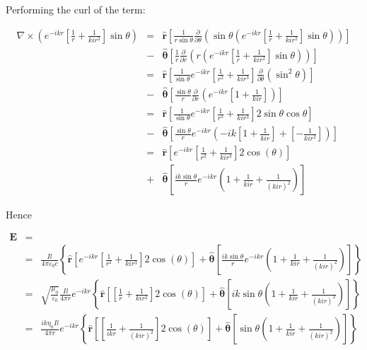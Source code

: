 \documentclass[a4paper,10pt]{thesis}
\begin{document}
Performing the curl of the term:

\begin{eqnarray}
\nabla \times \left( e^{-ikr } \left[  \frac{ 1}{ r}+ \frac{1}{kir^2}\right] \sin \theta \right)&=&\mathbf{\hat{r} }\left[ \frac{1}{r \sin \theta} \frac{\partial }{\partial \theta } \left( \sin \theta \left( e^{-ikr } \left[  \frac{ 1}{ r} +\frac{1}{kir^2}\right] \sin \theta \right) \right) \right] \nonumber \\
&-&\mathbf{ \hat{\theta}} \left[ \frac{1}{r} \frac{\partial }{\partial r } \left( r \left( e^{-ikr } \left[  \frac{ 1}{ r}+ \frac{1}{kir^2}\right] \sin \theta \right) \right) \right]\nonumber \\
&=&\mathbf{\hat{r}} \left[ \frac{1}{ \sin \theta} e^{-ikr } \left[  \frac{ 1}{ r^2} +\frac{1}{kir^3}\right] \frac{\partial }{\partial \theta } \left( \sin^2 \theta     \right) \right] \nonumber \\
&-&\mathbf{ \hat{\theta}} \left[ \frac{\sin \theta}{r} \frac{\partial }{\partial r } \left(   e^{-ikr } \left[  1 + \frac{1}{kir}\right]  \right) \right]\nonumber\\
&=&\mathbf{\hat{r}} \left[ \frac{1}{ \sin \theta} e^{-ikr } \left[  \frac{ 1}{ r^2} +\frac{1}{kir^3}\right]  2 \sin \theta \cos \theta     \right] \nonumber \\
&-& \mathbf{\hat{\theta}} \left[ \frac{\sin \theta}{r}  e^{-ikr } \left(  -ik   \left[  1 + \frac{1}{kir}\right]+   \left[ - \frac{1}{kir^2}\right] \right) \right] \nonumber \\
&=&\mathbf{\hat{r} }\left[ e^{-ikr } \left[  \frac{ 1}{ r^2} +\frac{1}{kir^3}\right]   2  \cos (\theta )   \right] \nonumber \\
&+&\mathbf{ \hat{\theta}} \left[ \frac{ik \sin \theta}{r}  e^{-ikr } \left( 1 + \frac{1}{kir}+  \frac{1}{(kir)^2} \right) \right]
\end{eqnarray}

Hence

\begin{eqnarray} \label{get_E_hd}
\mathbf{E}&=&\\
&=&\frac{  I l}{4 \pi \varepsilon_0 c} \left\{ \mathbf{\hat{r}} \left[ e^{-ikr } \left[  \frac{ 1}{ r^2} +\frac{1}{kir^3}\right]   2  \cos (\theta )   \right]
+\mathbf{ \hat{\theta}} \left[ \frac{ik \sin \theta}{r}  e^{-ikr } \left( 1 + \frac{1}{kir}+  \frac{1}{(kir)^2} \right) \right] \right\} \nonumber  \\
&=&\sqrt{\frac{\mu_0}{ \varepsilon_0}}\frac{  I l}{4 \pi r} e^{-ikr } \left\{ \mathbf{\hat{r}} \left[  \left[  \frac{ 1}{ r} +\frac{1}{kir^2}\right]   2  \cos (\theta )   \right]
+\mathbf{ \hat{\theta}} \left[ ik \sin \theta   \left( 1 + \frac{1}{kir}+  \frac{1}{(kir)^2} \right) \right] \right\} \nonumber  \\
&=&\frac{i k \eta_0 I l}{4 \pi r} e^{-ikr } \left\{ \mathbf{\hat{r} }\left[  \left[  \frac{ 1}{ i k r} +\frac{1}{(kir)^2}\right]   2  \cos (\theta )   \right]
+\mathbf{ \hat{\theta}} \left[  \sin \theta   \left( 1 + \frac{1}{kir}+  \frac{1}{(kir)^2} \right) \right] \right\} \nonumber
\end{eqnarray}
\end{document}
